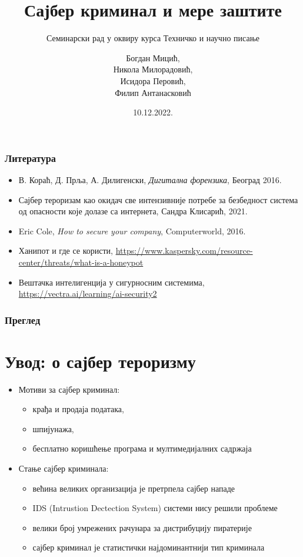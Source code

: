 \documentclass{beamer}
\title{Сајбер криминал и мере заштите}
\subtitle{Семинарски рад у оквиру курса Техничко и научно писање}
\author{Богдан Мицић, \\Никола Милорадовић, \\Исидора Перовић, \\Филип Антанасковић}
\institute{Математички факултет\\Универзитет у Београду}
\date{
  \footnotesize{10.12.2022.}
}
\begin{document}
\begin{frame}
  \thispagestyle{empty}
  \titlepage{}
\end{frame}
\addtocounter{framenumber}{-1}

\begin{frame}[fragile]\frametitle{Литература}
  \begin{itemize}
    \item В. Кораћ, Д. Прља, А. Дилигенски, \emph{Дигитална форензика}, Београд 2016.
    \item Сајбер тероризам као окидач све интензивније потребе за безбедност система од опасности које долазе са интернета, Сандра Клисарић, 2021.
    \item Eric Cole, \emph{How to secure your company}, Computerworld, 2016.
    \item Ханипот и где се користи, \url{https://www.kaspersky.com/resource-center/threats/what-is-a-honeypot}
    \item Вештачка интелигенција у сигурносним системима, \url{https://vectra.ai/learning/ai-security2}
  \end{itemize}
\end{frame}

\begin{frame}
	\frametitle{Преглед}
	\tableofcontents
\end{frame}

\section{Увод: о сајбер тероризму}

\begin{frame}
  \begin{itemize}
    \item Мотиви за сајбер криминал:
    \begin{itemize}
      \item крађа и продаја података,
      \item шпијунажа,
      \item бесплатно коришћење програма и мултимедијалних садржаја
    \end{itemize}
    \item Стање сајбер криминала:
    \begin{itemize}
      \item већина великих организација је претрпела сајбер нападе
      \item IDS (Intrustion Dectection System) системи нису решили проблеме
      \item велики број умрежених рачунара за дистрибуцију пиратерије
      \item сајбер криминал је статистички најдоминантнији тип криминала
    \end{itemize}
  \end{itemize}
\end{frame}
\end{document}

